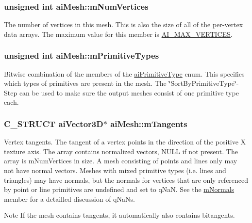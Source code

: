 \hypertarget{structaiMesh_ab34b7b5941e6636f1c08f615cbb072ef}{
\subsubsection[{m\-Num\-Vertices}]{\setlength{\rightskip}{0pt plus 5cm}unsigned int {\bf ai\-Mesh\-::m\-Num\-Vertices}}}\label{structaiMesh_ab34b7b5941e6636f1c08f615cbb072ef}
\-The number of vertices in this mesh. \-This is also the size of all of the per-\/vertex data arrays. \-The maximum value for this member is \hyperlink{mesh_8h_aa3997d5751b93f15e4c9d86ced093b56}{\-A\-I\-\_\-\-M\-A\-X\-\_\-\-V\-E\-R\-T\-I\-C\-E\-S}. \hypertarget{structaiMesh_a99d66ac0a444068c1b252b30265cbf53}{
\subsubsection[{m\-Primitive\-Types}]{\setlength{\rightskip}{0pt plus 5cm}unsigned int {\bf ai\-Mesh\-::m\-Primitive\-Types}}}\label{structaiMesh_a99d66ac0a444068c1b252b30265cbf53}
\-Bitwise combination of the members of the \hyperlink{mesh_8h_ac352902280db7c3bd8ba64c133b7f03f}{ai\-Primitive\-Type} enum. \-This specifies which types of primitives are present in the mesh. \-The \char`\"{}\-Sort\-By\-Primitive\-Type\char`\"{}-\/\-Step can be used to make sure the output meshes consist of one primitive type each. \hypertarget{structaiMesh_af367ff78bd69f3e83d7edc8ad67dc5df}{
\subsubsection[{m\-Tangents}]{\setlength{\rightskip}{0pt plus 5cm}\-C\-\_\-\-S\-T\-R\-U\-C\-T {\bf ai\-Vector3\-D}$\ast$ {\bf ai\-Mesh\-::m\-Tangents}}}\label{structaiMesh_af367ff78bd69f3e83d7edc8ad67dc5df}
\-Vertex tangents. \-The tangent of a vertex points in the direction of the positive \-X texture axis. \-The array contains normalized vectors, \-N\-U\-L\-L if not present. \-The array is m\-Num\-Vertices in size. \-A mesh consisting of points and lines only may not have normal vectors. \-Meshes with mixed primitive types (i.\-e. lines and triangles) may have normals, but the normals for vertices that are only referenced by point or line primitives are undefined and set to q\-Na\-N. \-See the \hyperlink{structaiMesh_aec81b496b4d93838cef038933dabe9b9}{m\-Normals} member for a detailled discussion of q\-Na\-Ns. \begin{DoxyNote}{\-Note}
\-If the mesh contains tangents, it automatically also contains bitangents. 
\end{DoxyNote}
